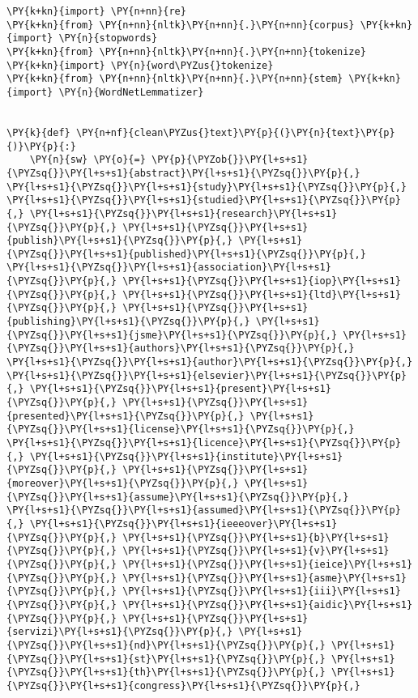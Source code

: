 \documentclass[../main.tex]{subfiles}
\begin{document}
    \begin{tcolorbox}[breakable, size=fbox, boxrule=1pt, pad at break*=1mm,colback=cellbackground, colframe=cellborder]
\begin{Verbatim}[commandchars=\\\{\}]
\PY{k+kn}{import} \PY{n+nn}{re}
\PY{k+kn}{from} \PY{n+nn}{nltk}\PY{n+nn}{.}\PY{n+nn}{corpus} \PY{k+kn}{import} \PY{n}{stopwords}
\PY{k+kn}{from} \PY{n+nn}{nltk}\PY{n+nn}{.}\PY{n+nn}{tokenize} \PY{k+kn}{import} \PY{n}{word\PYZus{}tokenize}
\PY{k+kn}{from} \PY{n+nn}{nltk}\PY{n+nn}{.}\PY{n+nn}{stem} \PY{k+kn}{import} \PY{n}{WordNetLemmatizer}


\PY{k}{def} \PY{n+nf}{clean\PYZus{}text}\PY{p}{(}\PY{n}{text}\PY{p}{)}\PY{p}{:}
    \PY{n}{sw} \PY{o}{=} \PY{p}{\PYZob{}}\PY{l+s+s1}{\PYZsq{}}\PY{l+s+s1}{abstract}\PY{l+s+s1}{\PYZsq{}}\PY{p}{,} \PY{l+s+s1}{\PYZsq{}}\PY{l+s+s1}{study}\PY{l+s+s1}{\PYZsq{}}\PY{p}{,} \PY{l+s+s1}{\PYZsq{}}\PY{l+s+s1}{studied}\PY{l+s+s1}{\PYZsq{}}\PY{p}{,} \PY{l+s+s1}{\PYZsq{}}\PY{l+s+s1}{research}\PY{l+s+s1}{\PYZsq{}}\PY{p}{,} \PY{l+s+s1}{\PYZsq{}}\PY{l+s+s1}{publish}\PY{l+s+s1}{\PYZsq{}}\PY{p}{,} \PY{l+s+s1}{\PYZsq{}}\PY{l+s+s1}{published}\PY{l+s+s1}{\PYZsq{}}\PY{p}{,} \PY{l+s+s1}{\PYZsq{}}\PY{l+s+s1}{association}\PY{l+s+s1}{\PYZsq{}}\PY{p}{,} \PY{l+s+s1}{\PYZsq{}}\PY{l+s+s1}{iop}\PY{l+s+s1}{\PYZsq{}}\PY{p}{,} \PY{l+s+s1}{\PYZsq{}}\PY{l+s+s1}{ltd}\PY{l+s+s1}{\PYZsq{}}\PY{p}{,} \PY{l+s+s1}{\PYZsq{}}\PY{l+s+s1}{publishing}\PY{l+s+s1}{\PYZsq{}}\PY{p}{,} \PY{l+s+s1}{\PYZsq{}}\PY{l+s+s1}{jsme}\PY{l+s+s1}{\PYZsq{}}\PY{p}{,} \PY{l+s+s1}{\PYZsq{}}\PY{l+s+s1}{authors}\PY{l+s+s1}{\PYZsq{}}\PY{p}{,} \PY{l+s+s1}{\PYZsq{}}\PY{l+s+s1}{author}\PY{l+s+s1}{\PYZsq{}}\PY{p}{,} \PY{l+s+s1}{\PYZsq{}}\PY{l+s+s1}{elsevier}\PY{l+s+s1}{\PYZsq{}}\PY{p}{,} \PY{l+s+s1}{\PYZsq{}}\PY{l+s+s1}{present}\PY{l+s+s1}{\PYZsq{}}\PY{p}{,} \PY{l+s+s1}{\PYZsq{}}\PY{l+s+s1}{presented}\PY{l+s+s1}{\PYZsq{}}\PY{p}{,} \PY{l+s+s1}{\PYZsq{}}\PY{l+s+s1}{license}\PY{l+s+s1}{\PYZsq{}}\PY{p}{,} \PY{l+s+s1}{\PYZsq{}}\PY{l+s+s1}{licence}\PY{l+s+s1}{\PYZsq{}}\PY{p}{,} \PY{l+s+s1}{\PYZsq{}}\PY{l+s+s1}{institute}\PY{l+s+s1}{\PYZsq{}}\PY{p}{,} \PY{l+s+s1}{\PYZsq{}}\PY{l+s+s1}{moreover}\PY{l+s+s1}{\PYZsq{}}\PY{p}{,} \PY{l+s+s1}{\PYZsq{}}\PY{l+s+s1}{assume}\PY{l+s+s1}{\PYZsq{}}\PY{p}{,} \PY{l+s+s1}{\PYZsq{}}\PY{l+s+s1}{assumed}\PY{l+s+s1}{\PYZsq{}}\PY{p}{,} \PY{l+s+s1}{\PYZsq{}}\PY{l+s+s1}{ieeeover}\PY{l+s+s1}{\PYZsq{}}\PY{p}{,} \PY{l+s+s1}{\PYZsq{}}\PY{l+s+s1}{b}\PY{l+s+s1}{\PYZsq{}}\PY{p}{,} \PY{l+s+s1}{\PYZsq{}}\PY{l+s+s1}{v}\PY{l+s+s1}{\PYZsq{}}\PY{p}{,} \PY{l+s+s1}{\PYZsq{}}\PY{l+s+s1}{ieice}\PY{l+s+s1}{\PYZsq{}}\PY{p}{,} \PY{l+s+s1}{\PYZsq{}}\PY{l+s+s1}{asme}\PY{l+s+s1}{\PYZsq{}}\PY{p}{,} \PY{l+s+s1}{\PYZsq{}}\PY{l+s+s1}{iii}\PY{l+s+s1}{\PYZsq{}}\PY{p}{,} \PY{l+s+s1}{\PYZsq{}}\PY{l+s+s1}{aidic}\PY{l+s+s1}{\PYZsq{}}\PY{p}{,} \PY{l+s+s1}{\PYZsq{}}\PY{l+s+s1}{servizi}\PY{l+s+s1}{\PYZsq{}}\PY{p}{,} \PY{l+s+s1}{\PYZsq{}}\PY{l+s+s1}{nd}\PY{l+s+s1}{\PYZsq{}}\PY{p}{,} \PY{l+s+s1}{\PYZsq{}}\PY{l+s+s1}{st}\PY{l+s+s1}{\PYZsq{}}\PY{p}{,} \PY{l+s+s1}{\PYZsq{}}\PY{l+s+s1}{th}\PY{l+s+s1}{\PYZsq{}}\PY{p}{,} \PY{l+s+s1}{\PYZsq{}}\PY{l+s+s1}{congress}\PY{l+s+s1}{\PYZsq{}}\PY{p}{,}

\end{Verbatim}
\end{tcolorbox}
\end{document}
